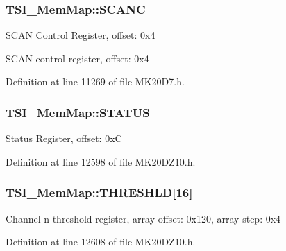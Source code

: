 \subsubsection[{\texorpdfstring{S\+C\+A\+NC}{SCANC}}]{ T\+S\+I\+\_\+\+Mem\+Map\+::\+S\+C\+A\+NC}\hypertarget{struct_t_s_i___mem_map_abbf29c929817b57dbec256343e066a85}{}\label{struct_t_s_i___mem_map_abbf29c929817b57dbec256343e066a85}
S\+C\+AN Control Register, offset\+: 0x4

S\+C\+AN control register, offset\+: 0x4 

Definition at line 11269 of file M\+K20\+D7.\+h.

\subsubsection[{\texorpdfstring{S\+T\+A\+T\+US}{STATUS}}]{ T\+S\+I\+\_\+\+Mem\+Map\+::\+S\+T\+A\+T\+US}\hypertarget{struct_t_s_i___mem_map_a2e515588d62f40e0b2950b266b739ffd}{}\label{struct_t_s_i___mem_map_a2e515588d62f40e0b2950b266b739ffd}
Status Register, offset\+: 0xC 

Definition at line 12598 of file M\+K20\+D\+Z10.\+h.

\subsubsection[{\texorpdfstring{T\+H\+R\+E\+S\+H\+LD}{THRESHLD}}]{ T\+S\+I\+\_\+\+Mem\+Map\+::\+T\+H\+R\+E\+S\+H\+LD\mbox{[}16\mbox{]}}\hypertarget{struct_t_s_i___mem_map_ab227f17724905939b287656009e50f03}{}\label{struct_t_s_i___mem_map_ab227f17724905939b287656009e50f03}
Channel n threshold register, array offset\+: 0x120, array step\+: 0x4 

Definition at line 12608 of file M\+K20\+D\+Z10.\+h.

